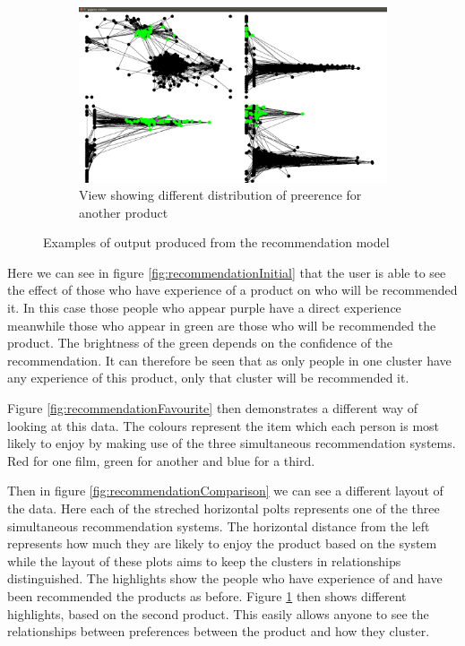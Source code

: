 \documentclass[12pt,a4paper]{article}
\begin{document}
\begin{figure}[htb]
\begin{subfigure}[c]{0.4\linewidth}
	\end{subfigure}
\quad
	\begin{subfigure}[c]{0.4\linewidth}
	\caption{View showing different distribution of preerence for another product}
	\label{fig:recommendationDifferent}
	\includegraphics[scale=0.1]{Recommendation4.png}
	\end{subfigure}
\caption{Examples of output produced from the recommendation model}
\label{fig:recommendation}
\end{figure}

Here we can see in figure \ref{fig:recommendationInitial} that the user is able to see the effect of those who have experience of a product on who will be recommended it. In this case those people who appear purple have a direct experience meanwhile those who appear in green are those who will be recommended the product. The brightness of the green depends on the confidence of the recommendation. It can therefore be seen that as only people in one cluster have any experience of this product, only that cluster will be recommended it.

Figure \ref{fig:recommendationFavourite} then demonstrates a different way of looking at this data. The colours represent the item which each person is most likely to enjoy by making use of the three simultaneous recommendation systems. Red for one film, green for another and blue for a third.

Then in figure \ref{fig:recommendationComparison} we can see a different layout of the data. Here each of the streched horizontal polts represents one of the three simultaneous recommendation systems. The horizontal distance from the left represents how much they are likely to enjoy the product based on the system while the layout of these plots aims to keep the clusters in relationships distinguished. The highlights show the people who have experience of and have been recommended the products as before. Figure \ref{fig:recommendationDifferent} then shows different highlights, based on the second product. This easily allows anyone to see the relationships between preferences between the product and how they cluster.
\end{document}
